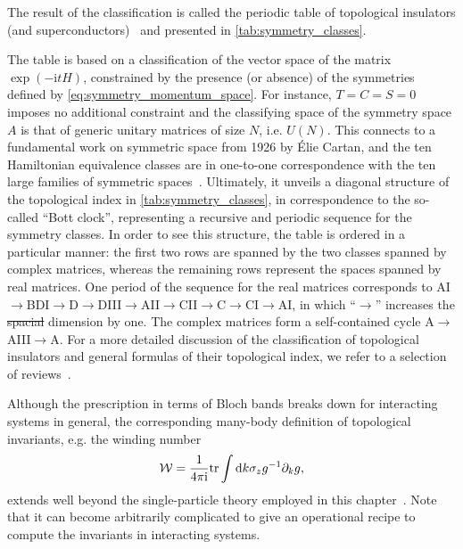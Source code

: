 \documentclass{svmono}
\def\ri{\mathrm i}
\def\rd{\mathrm d}
\def\tr{{\rm tr}}
\providecommand{\DIFaddtex}[1]{{\protect\color{blue}\uwave{#1}}} %
\providecommand{\DIFdeltex}[1]{{\protect\color{red}\sout{#1}}}                      %
\providecommand{\DIFaddbegin}{} %
\providecommand{\DIFaddend}{} %
\providecommand{\DIFdelbegin}{} %
\providecommand{\DIFdelend}{} %
\providecommand{\DIFadd}[1]{\texorpdfstring{\DIFaddtex{#1}}{#1}} %
\providecommand{\DIFdel}[1]{\texorpdfstring{\DIFdeltex{#1}}{}} %
\newcommand{\DIFscaledelfig}{0.5}
\newlength{\DIFdelgraphicswidth} %
\newlength{\DIFdelgraphicsheight} %
\newcommand{\DIFaddincludegraphics}[2][]{{\color{blue}\fbox{\DIFOincludegraphics[#1]{#2}}}} %
\newcommand{\DIFdelincludegraphics}[2][]{%
\sbox{\DIFdelgraphicsbox}{\DIFOincludegraphics[#1]{#2}}%
\settoboxwidth{\DIFdelgraphicswidth}{\DIFdelgraphicsbox} %
\settoboxtotalheight{\DIFdelgraphicsheight}{\DIFdelgraphicsbox} %
\scalebox{\DIFscaledelfig}{%
\parbox[b]{\DIFdelgraphicswidth}{\usebox{\DIFdelgraphicsbox}\\[-\baselineskip] \rule{\DIFdelgraphicswidth}{0em}}\llap{\resizebox{\DIFdelgraphicswidth}{\DIFdelgraphicsheight}{%
\setlength{\unitlength}{\DIFdelgraphicswidth}%
\begin{picture}(1,1)%
\thicklines\linethickness{2pt} %
{\color[rgb]{1,0,0}\put(0,0){\framebox(1,1){}}}%
{\color[rgb]{1,0,0}\put(0,0){\line( 1,1){1}}}%
{\color[rgb]{1,0,0}\put(0,1){\line(1,-1){1}}}%
\end{picture}%
}\hspace*{3pt}}} %
} %
\DeclareRobustCommand{\DIFaddbegin}{\DIFOaddbegin \let\includegraphics\DIFaddincludegraphics} %
\DeclareRobustCommand{\DIFaddend}{\DIFOaddend \let\includegraphics\DIFOincludegraphics} %
\DeclareRobustCommand{\DIFdelbegin}{\DIFOdelbegin \let\includegraphics\DIFdelincludegraphics} %
\DeclareRobustCommand{\DIFdelend}{\DIFOaddend \let\includegraphics\DIFOincludegraphics} %
\begin{document}
The result of the classification is called the periodic table of topological insulators (and superconductors)~\cite{Kitaev2009,Qi2008,Ryu2010,Schnyder2008} and presented in \cref{tab:symmetry_classes}.

The table is based on a classification of the vector space of the matrix $\exp(-\ri t H)$, constrained by the presence (or absence) of the symmetries defined by \cref{eq:symmetry_momentum_space}.
For instance, $T=C=S=0$ imposes no additional constraint and the classifying space of the symmetry space $A$ is that of generic unitary matrices of size $N$, i.e. $U(N)$.
This connects to a fundamental work on symmetric space from 1926 by Élie Cartan, and the ten Hamiltonian equivalence classes are in one-to-one correspondence with the ten large families of symmetric spaces~\cite{Heinzner2005}.
Ultimately, it unveils a diagonal structure of the topological index in \cref{tab:symmetry_classes}, in correspondence to the so-called ``Bott clock'', representing a recursive and periodic sequence for the symmetry classes.
In order to see this structure, the table is ordered in a particular manner: the first two rows are spanned by the two classes spanned by complex matrices, whereas the remaining rows represent the spaces spanned by real matrices.
One period of the sequence for the real matrices corresponds to AI$\rightarrow$BDI$\rightarrow$D$\rightarrow$DIII$\rightarrow$AII$\rightarrow$CII$\rightarrow$C$\rightarrow$CI$\rightarrow$AI, in which ``$\rightarrow$'' increases the \DIFdelbegin \DIFdel{spacial }\DIFdelend \DIFaddbegin \DIFadd{spatial }\DIFaddend dimension by one.
The complex matrices form a self-contained cycle A$\rightarrow$AIII$\rightarrow$A.
For a more detailed discussion of the classification of topological insulators and general formulas of their topological index, we refer to a selection of reviews~\cite{Hasan2010,Chiu2016,Cooper2019}.

Although the prescription in terms of Bloch bands breaks down for interacting systems in general, the corresponding many-body definition of topological invariants, e.g. the winding number
\begin{align}
    \mathcal W = \frac{1}{4\pi\ri} \tr\int\rd k \sigma_z g^{-1}\partial_k g,
    \label{eq:winding_number_greens}
\end{align}
extends well beyond the single-particle theory employed in this chapter~\cite{Gurarie2011,Manmana2012}.
Note that it can become arbitrarily complicated to give an operational recipe to compute the invariants in interacting systems.
\DIFdelbegin %
\end{document}
